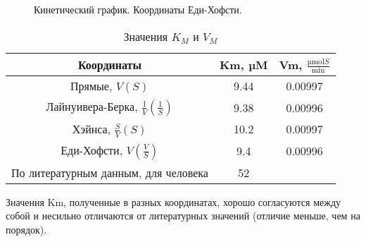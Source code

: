 \begin{figure}[htbp]

\caption{Кинетический график.
    Координаты Еди-Хофсти.}
\label{km-eh}
\end{figure}

\begin{table}[htbp]
\caption{Значения $K_M$ и $V_M$}
\begin{tabular}{|c|c|c|}
\hline
Координаты & Km, µM & Vm, $\frac{\text{µmol} S}{\text{min}}$ \\
\hline
Прямые,           $V(S)$                       & 9.44 & 0.00997 \\
Лайнуивера-Берка, $\frac{1}{V}(\frac{1}{S})$   & 9.38 & 0.00996 \\
Хэйнса,           $\frac{S}{V}(S)$             & 10.2 & 0.00997 \\
Еди-Хофсти,       $V(\frac{V}{S})$             & 9.4  & 0.00996 \\
\hline
По литературным данным, для человека \cite{uniprot-human}
                                               & 52 & \\
\hline
\end{tabular}
\label{table-km-and-vm}
\end{table}

Значения Km, полученные в разных координатах, хорошо согласуются между собой
и несильно отличаются от литературных значений (отличие меньше, чем на порядок).

